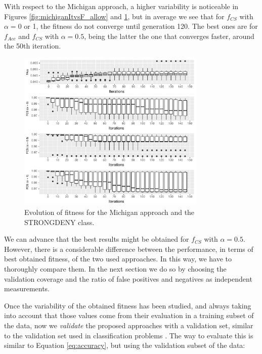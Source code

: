 \documentclass[runningheads]{llncs}
\begin{document}
With respect to the Michigan approach, a higher variability is noticeable in Figures \ref{fig:michiganItvsF_allow} and \ref{fig:michiganItvsF_deny}, but in average we see that for $f_{CS}$ with $\alpha = 0$ or 1, the fitness do not converge until generation 120. The best ones are for $f_{Acc}$ and $f_{CS}$ with $\alpha = 0.5$, being the latter the one that converges faster, around the 50th iteration.

\begin{figure}[h!tb]
	\centering
	\includegraphics[width=0.8\textwidth]{img/michiganItvsF_deny.pdf}
	\caption{Evolution of fitness for the Michigan approach
          and the  STRONGDENY class.}
	\label{fig:michiganItvsF_deny}
\end{figure}

We can advance that the best results might be obtained for $f_{CS}$
with $\alpha = 0.5$. However, there is a considerable difference between the performance, in terms of best
obtained fitness, of the two used approaches. In this way, we have to thoroughly compare them. In the next section we do so by choosing the validation coverage and the ratio of false positives and negatives as independent measurements. 

\label{subsec:approachcomparison}

Once the variability of the obtained fitness has been studied, and
always taking into account that those values come from their
evaluation in a training subset of the data, now we \textit{validate}
the proposed approaches with a validation set, similar to the validation set used in classification problems \cite{witten2005data}. 
 The way to evaluate this is similar to Equation \ref{eq:accuracy}, but using the validation subset of the data:
\end{document}
